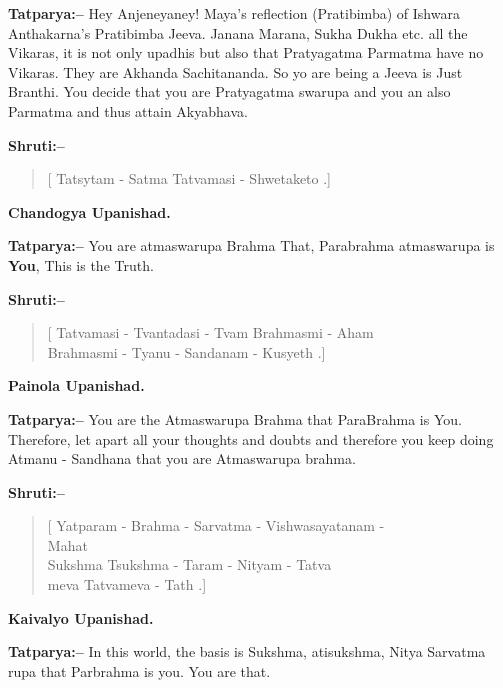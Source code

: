 \textbf{Tatparya:–} Hey Anjeneyaney! Maya's reflection (Pratibimba) of Ishwara Anthakarna's Pratibimba Jeeva. Janana Marana, Sukha Dukha etc. all the Vikaras, it is not only upadhis but also that Pratyagatma Parmatma have no Vikaras. They are Akhanda Sachitananda. So yo are being a Jeeva is Just Branthi. You decide that you are Pratyagatma swarupa and you an also Parmatma and thus attain Akyabhava.

\textbf{Shruti:–}

\begin{verse}
[ Tatsytam - Satma Tatvamasi - Shwetaketo .]
\end{verse}

\begin{flushright}
\textbf{Chandogya Upanishad.}
\end{flushright}

\textbf{Tatparya:–} You are atmaswarupa Brahma That, Parabrahma atmaswarupa is \textbf{You}, This is the Truth.

\textbf{Shruti:–}

\begin{verse}
[ Tatvamasi - Tvantadasi - Tvam Brahmasmi - Aham\\ Brahmasmi - Tyanu - Sandanam - Kusyeth .]
\end{verse}

\begin{flushright}
\textbf{Painola Upanishad.}
\end{flushright}

\textbf{Tatparya:–} You are the Atmaswarupa Brahma that ParaBrahma is You. Therefore, let apart all your thoughts and doubts and therefore you keep doing Atmanu - Sandhana that you are Atmaswarupa brahma.

\textbf{Shruti:–}

\begin{verse}
[ Yatparam - Brahma - Sarvatma - Vishwasayatanam -\\ Mahat \\ Sukshma Tsukshma - Taram - Nityam - Tatva\\meva Tatvameva - Tath .]
\end{verse}

\begin{flushright}
\textbf{Kaivalyo Upanishad.}
\end{flushright}

\textbf{Tatparya:–} In this world, the basis is Sukshma, atisukshma, Nitya Sarvatma rupa that Parbrahma is you. You are that.

